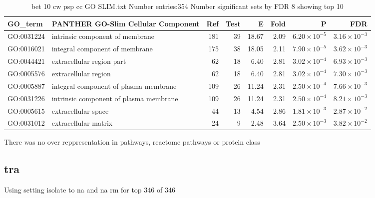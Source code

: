 \begin{table}[ht]
\centering
\begin{adjustbox}{width=\textwidth}
\begin{tabular}{llrrrrrr}
  \hline
GO\_term & PANTHER GO-Slim Cellular Component & Ref & Test & E & Fold & P & FDR \\ 
  \hline
GO:0031224 & intrinsic component of membrane  & 181 & 39 & 18.67 & 2.09 & $6.20 \times 10^{-5}$ & $3.16 \times 10^{-3}$ \\ 
  GO:0016021 & integral component of membrane  & 175 & 38 & 18.05 & 2.11 & $7.90 \times 10^{-5}$ & $3.62 \times 10^{-3}$ \\ 
  GO:0044421 & extracellular region part  & 62 & 18 & 6.40 & 2.81 & $3.02 \times 10^{-4}$ & $6.93 \times 10^{-3}$ \\ 
  GO:0005576 & extracellular region  & 62 & 18 & 6.40 & 2.81 & $3.02 \times 10^{-4}$ & $7.30 \times 10^{-3}$ \\ 
  GO:0005887 & integral component of plasma membrane  & 109 & 26 & 11.24 & 2.31 & $2.50 \times 10^{-4}$ & $7.66 \times 10^{-3}$ \\ 
  GO:0031226 & intrinsic component of plasma membrane  & 109 & 26 & 11.24 & 2.31 & $2.50 \times 10^{-4}$ & $8.21 \times 10^{-3}$ \\ 
  GO:0005615 & extracellular space  & 44 & 13 & 4.54 & 2.86 & $1.81 \times 10^{-3}$ & $2.87 \times 10^{-2}$ \\ 
  GO:0031012 & extracellular matrix  & 24 & 9 & 2.48 & 3.64 & $2.50 \times 10^{-3}$ & $3.82 \times 10^{-2}$ \\ 
  \hline
\end{tabular}
\end{adjustbox}
\caption{bet 10 cw psp cc GO SLIM.txt Number entries:354 Number significant sets by FDR 8 showing top 10} 
\label{tab:bet 10 cw psp cc GO SLIM.txt Number entries:354 Number significant sets by FDR 8 showing top 10}
\end{table}

There was no over reppresentation in pathways, reactome pathways or protein class

\clearpage
\subsection{tra}

Using setting isolate to na and na rm for top
346 of 346


